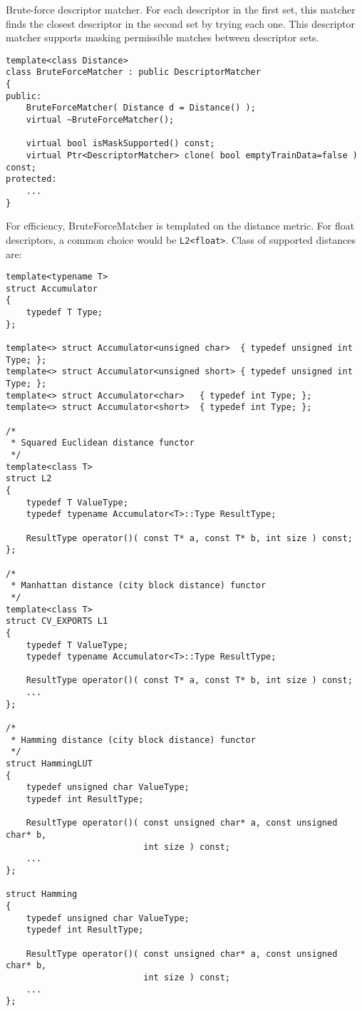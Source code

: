 Brute-force descriptor matcher. For each descriptor in the first set, this matcher finds the closest
descriptor in the second set by trying each one. This descriptor matcher supports masking 
permissible matches between descriptor sets.

\begin{lstlisting}
template<class Distance>
class BruteForceMatcher : public DescriptorMatcher
{
public:
    BruteForceMatcher( Distance d = Distance() );
    virtual ~BruteForceMatcher();

    virtual bool isMaskSupported() const;
    virtual Ptr<DescriptorMatcher> clone( bool emptyTrainData=false ) const;
protected:
    ...
}
\end{lstlisting}

For efficiency, BruteForceMatcher is templated on the distance metric.
For float descriptors, a common choice would be \texttt{L2<float>}. Class of supported distances are:

\begin{lstlisting}
template<typename T>
struct Accumulator
{
    typedef T Type;
};

template<> struct Accumulator<unsigned char>  { typedef unsigned int Type; };
template<> struct Accumulator<unsigned short> { typedef unsigned int Type; };
template<> struct Accumulator<char>   { typedef int Type; };
template<> struct Accumulator<short>  { typedef int Type; };

/*
 * Squared Euclidean distance functor
 */
template<class T>
struct L2
{
    typedef T ValueType;
    typedef typename Accumulator<T>::Type ResultType;

    ResultType operator()( const T* a, const T* b, int size ) const;
};

/*
 * Manhattan distance (city block distance) functor
 */
template<class T>
struct CV_EXPORTS L1
{
    typedef T ValueType;
    typedef typename Accumulator<T>::Type ResultType;

    ResultType operator()( const T* a, const T* b, int size ) const;
    ...
};

/*
 * Hamming distance (city block distance) functor
 */
struct HammingLUT
{
    typedef unsigned char ValueType;
    typedef int ResultType;

    ResultType operator()( const unsigned char* a, const unsigned char* b, 
                           int size ) const;
    ...
};

struct Hamming
{
    typedef unsigned char ValueType;
    typedef int ResultType;

    ResultType operator()( const unsigned char* a, const unsigned char* b, 
                           int size ) const;
    ...
};
\end{lstlisting}


